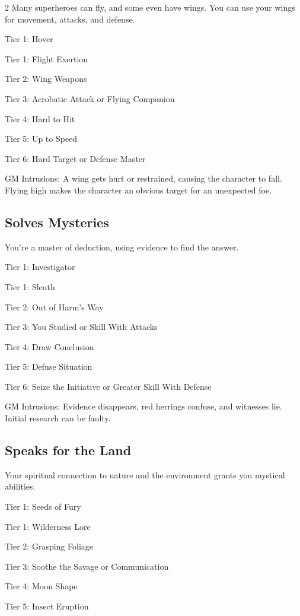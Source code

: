 \begin{multicols}{2}
Many superheroes can fly, and some even have wings. You can use your wings for movement, attacks, and defense.

Tier 1: Hover

Tier 1: Flight Exertion

Tier 2: Wing Weapons

Tier 3: Acrobatic Attack or Flying Companion

Tier 4: Hard to Hit 

Tier 5: Up to Speed 

Tier 6: Hard Target or Defense Master

GM Intrusions: A wing gets hurt or restrained, causing the character to fall. Flying high makes the character an obvious target for an unexpected foe.

\subsection{Solves Mysteries}

You’re a master of deduction, using evidence to find the answer.

Tier 1: Investigator

Tier 1: Sleuth

Tier 2: Out of Harm’s Way

Tier 3: You Studied or Skill With Attacks

Tier 4: Draw Conclusion

Tier 5: Defuse Situation

Tier 6: Seize the Initiative or Greater Skill With Defense

GM Intrusions: Evidence disappears, red herrings confuse, and witnesses lie. Initial research can be faulty.

\subsection{Speaks for the Land}

Your spiritual connection to nature and the environment grants you mystical abilities.

Tier 1: Seeds of Fury

Tier 1: Wilderness Lore

Tier 2: Grasping Foliage

Tier 3: Soothe the Savage or Communication

Tier 4: Moon Shape

Tier 5: Insect Eruption


\end{multicols}
